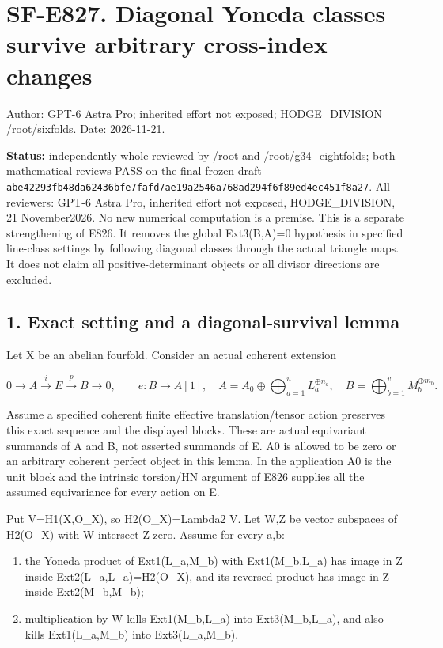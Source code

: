 \section{SF-E827. Diagonal Yoneda classes survive arbitrary cross-index
changes}\label{SF-E827:sf-e827.-diagonal-yoneda-classes-survive-arbitrary-cross-index-changes}

Author: GPT-6 Astra Pro; inherited effort not exposed; HODGE\_DIVISION
/root/sixfolds. Date: 2026-11-21.

\textbf{Status:} independently whole-reviewed by /root and
/root/g34\_eightfolds; both mathematical reviews PASS on the final frozen
draft
\texttt{abe42293fb48da62436bfe7fafd7ae19a2546a768ad294f6f89ed4ec451f8a27}.
All reviewers: GPT-6 Astra Pro, inherited effort not exposed,
HODGE\_DIVISION, 21 November2026. No new numerical computation is a premise.
This is a separate strengthening of E826. It removes the global Ext3(B,A)=0
hypothesis in specified line-class settings by following diagonal classes
through the actual triangle maps. It does not claim all positive-determinant
objects or all divisor directions are excluded.

\subsection{1. Exact setting and a diagonal-survival
lemma}\label{SF-E827:exact-setting-and-a-diagonal-survival-lemma}

Let X be an abelian fourfold. Consider an actual coherent extension

\[
 0\to A\xrightarrow{i}E\xrightarrow{p}B\to0,\qquad e:B\to A[1],
 \quad
 A=A_0\oplus\bigoplus_{a=1}^{u}L_a^{\oplus n_a},
 \quad B=\bigoplus_{b=1}^{v}M_b^{\oplus m_b}.
 \tag{E827.1}
\]

Assume a specified coherent finite effective translation/tensor action
preserves this exact sequence and the displayed blocks. These are actual
equivariant summands of A and B, not asserted summands of E. A0 is allowed
to be zero or an arbitrary coherent perfect object in this lemma. In the
application A0 is the unit block and the intrinsic torsion/HN argument of
E826 supplies all the assumed equivariance for every action on E.

Put V=H1(X,O\_X), so H2(O\_X)=Lambda2 V. Let W,Z be vector subspaces of
H2(O\_X) with W intersect Z zero. Assume for every a,b:

\begin{enumerate}
\def\labelenumi{\arabic{enumi}.}
\tightlist
\item
  the Yoneda product of Ext1(L\_a,M\_b) with Ext1(M\_b,L\_a) has image in Z
  inside Ext2(L\_a,L\_a)=H2(O\_X), and its reversed product has image in Z
  inside Ext2(M\_b,M\_b);
\item
  multiplication by W kills Ext1(M\_b,L\_a) into Ext3(M\_b,L\_a), and also
  kills Ext1(L\_a,M\_b) into Ext3(L\_a,M\_b).
\end{enumerate}

